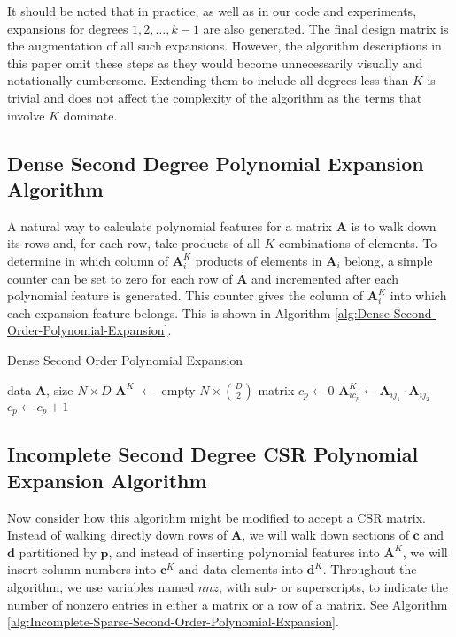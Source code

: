 \documentclass{article}
\begin{document}
It should be noted that in practice, as well as in our code and experiments, expansions for degrees $1, 2, \dots, k-1$ are also generated.
The final design matrix is the augmentation of all such expansions.
However, the algorithm descriptions in this paper omit these steps as they would become unnecessarily visually and notationally cumbersome.
Extending them to include all degrees less than $K$ is trivial and does not affect the complexity of the algorithm as the terms that involve $K$ dominate.

\subsection{Dense Second Degree Polynomial Expansion Algorithm}
A natural way to calculate polynomial features for a matrix $\bm{A}$ is to walk down its rows and, for each row, take products of all $K$-combinations of elements.
To determine in which column of $\bm{A}^K_i$ products of elements in $\bm{A}_i$ belong, a simple counter can be set to zero for each row of $\bm{A}$ and incremented after each polynomial feature is generated.
This counter gives the column of $\bm{A}^K_i$ into which each expansion feature belongs.
This is shown in Algorithm \ref{alg:Dense-Second-Order-Polynomial-Expansion}.


\begin{algorithm}%
   \caption{Dense Second Order Polynomial Expansion}
   \label{alg:Dense-Second-Order-Polynomial-Expansion}
\begin{algorithmic}[1]
    data $\bm{A}$, size $N \times D$
   \STATE $\bm{A}^K$ $\gets$ empty $N \times \binom{D}{2}$ matrix
      \STATE $c_p \gets 0$
              \STATE $\bm{A}^K_{i{c_p}} \gets \bm{A}_{ij_1} \cdot \bm{A}_{ij_2}$
              \STATE $c_p \gets c_p + 1$
          \ENDFOR
      \ENDFOR
   \ENDFOR
\end{algorithmic}
\end{algorithm}


\subsection{Incomplete Second Degree CSR Polynomial Expansion Algorithm}
\label{sec:final-algo}
Now consider how this algorithm might be modified to accept a CSR matrix.
Instead of walking directly down rows of $\bm{A}$, we will walk down sections of $\bm{c}$ and $\bm{d}$ partitioned by $\bm{p}$, and instead of inserting polynomial features into $\bm{A}^K$, we will insert column numbers into $\bm{c}^K$ and data elements into $\bm{d}^K$.
Throughout the algorithm, we use variables named $nnz$, with sub- or superscripts, to indicate the number of nonzero entries in either a matrix or a row of a matrix. 
See Algorithm \ref{alg:Incomplete-Sparse-Second-Order-Polynomial-Expansion}.
\end{document}

